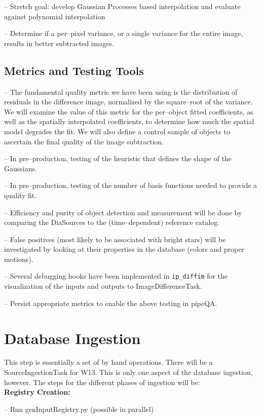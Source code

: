 \documentclass[12pt]{article}
\begin{document}
-- Stretch goal: develop Gaussian Processes based interpolation and
evaluate against polynomial interpolation

-- Determine if a per--pixel variance, or a single variance for the entire
image, results in better subtracted images.

\subsection{Metrics and Testing Tools}

-- The fundamental quality metric we have been using is the
distribution of residuals in the difference image, normalized by the
square--root of the variance.  We will examine the value of this
metric for the per--object fitted coefficients, as well as the
spatially interpolated coefficients, to determine how much the spatial
model degrades the fit.  We will also define a control sample of
objects to ascertain the final quality of the image subtraction.

-- In pre--production, testing of the heuristic that defines the shape
of the Gaussians.

-- In pre--production, testing of the number of basis functions needed
to provide a quality fit.  

-- Efficiency and purity of object detection and measurement will be
done by comparing the DiaSources to the (time--dependent) reference
catalog.

-- False positives (most likely to be associated with bright stars)
will be investigated by looking at their properties in the database
(colors and proper motions).

-- Several debugging hooks have been implemented in {\tt ip\_diffim} for
the visualization of the inputs and outputs to ImageDifferenceTask.

-- Persist appropriate metrics to enable the above testing in pipeQA.


\section{Database Ingestion} 
This step is essentially a set of by hand operations.  
There will be a SourceIngestionTask for W13.  This is only one aspect of the
database ingestion, however.  The steps for the different phases of ingestion will be:\\
{\bf Registry Creation:}

-- Run genInputRegistry.py (possible in parallel)
\end{document}
